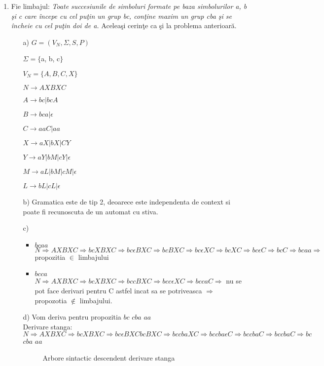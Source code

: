 \begin{enumerate}
\item
Fie limbajul: \textit{Toate succesiunile de simboluri formate pe baza simbolurilor a, b şi c care începe cu cel puţin un grup bc, conţine maxim un grup cba şi se încheie cu cel puţin doi de a.} Aceleaşi cerinţe ca şi la problema anterioară.

\begin{itemize}
\item[a)]
$G = (V_{N}, \Sigma, S, P)$

$\Sigma = \{$a, b, c$\} $ 

$V_{N}= \{A, B, C, X\}$

$N \rightarrow AXBXC$

$A \rightarrow bc|bcA $

$B \rightarrow bca|\epsilon $

$C \rightarrow aaC|aa $

$X \rightarrow aX|bX|CY$

$Y \rightarrow aY|bM|cY|\epsilon$

$M \rightarrow aL|bM|cM|\epsilon$

$L \rightarrow bL|cL|\epsilon$
 
\item[b)]
Gramatica este de tip 2, deoarece este independenta de context si poate fi recunoscuta de un automat cu stiva.

\item[c)]
\begin{itemize}
\item $bcaa$
\\$N \Rightarrow AXBXC \Rightarrow bcXBXC \Rightarrow bc\epsilon BXC \Rightarrow bcBXC \Rightarrow bc \epsilon XC \Rightarrow bcXC \Rightarrow bc\epsilon C \Rightarrow bcC \Rightarrow bcaa  \Rightarrow$ propozitia $\in$ limbajului
\item $bcca$
\\$N \Rightarrow AXBXC \Rightarrow bcXBXC \Rightarrow bccBXC \Rightarrow bcc \epsilon XC \Rightarrow bccaC \Rightarrow $ nu se pot face derivari pentru C astfel incat sa se potriveasca $\Rightarrow$  propozotia $\notin$ limbajului.
\end{itemize}

\item[d)]
Vom deriva pentru propozitia $bc$ $cba$ $aa$
\\Derivare stanga:
\\$N \Rightarrow AXBXC \Rightarrow bcXBXC \Rightarrow bc \epsilon BXC bc BXC \Rightarrow bc cba XC \Rightarrow bc cba \epsilon C \Rightarrow bc cba C \Rightarrow bccbaC \Rightarrow bc$ $cba$ $aa$
\begin{figure}[h]
\centering
{}
\caption{Arbore sintactic descendent derivare stanga}
\end{figure}


\end{itemize}
\end{enumerate}
